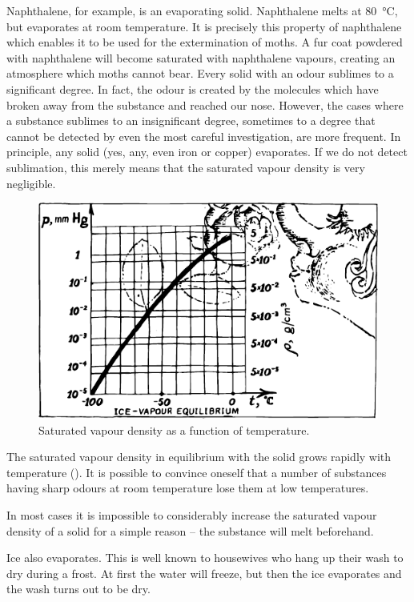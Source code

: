Naphthalene, for example, is an evaporating solid. Naphthalene melts at \SI{80}{\celsius}, but evaporates at room tem­perature. It is precisely this property of naphthalene which enables it to be used for the extermination of moths. A fur coat powdered with naphthalene will become saturated with naphthalene vapours, creating an atmo­sphere which moths cannot bear. Every solid with an odour sublimes to a significant degree. In fact, the odour is created by the molecules which have broken away from the substance and reached our nose. However, the cases where a substance sublimes to an insignificant degree, sometimes to a degree that cannot be detected by even the most careful investigation, are more frequent. In prin­ciple, any solid (yes, any, even iron or copper) evaporates. If we do not detect sublimation, this merely means that the saturated vapour density is very negligible.
\begin{figure}[!ht]
\centering
\includegraphics[width=\textwidth]{figures/fig-04-10.pdf}
\caption{Saturated vapour density as a function of temperature.}
\label{fig-4.10}
\end{figure}
The saturated vapour density in equilibrium with the solid grows rapidly with temperature (). It is possible to convince oneself that a number of substances having sharp odours at room temperature lose them at low temperatures.

In most cases it is impossible to considerably increase the saturated vapour density of a solid for a simple rea­son -- the substance will melt beforehand.

Ice also evaporates. This is well known to housewives who hang up their wash to dry during a frost. At first the water will freeze, but then the ice evaporates and the wash turns out to be dry.


